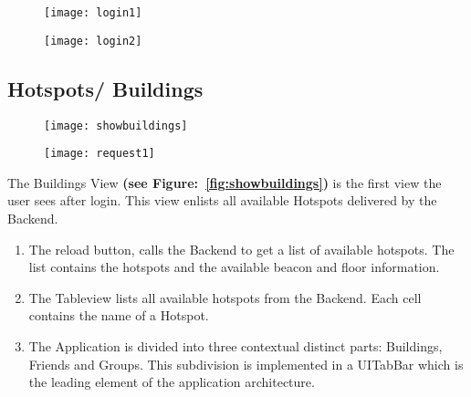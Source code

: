 \begin{figure}
\centering
\begin{minipage}{.5\textwidth}
  \centering
  \texttt{[image: login1]}
  \label{fig:login1}
\end{minipage}%
\begin{minipage}{.5\textwidth}
  \centering
  \texttt{[image: login2]}
  \label{fig:login2}
\end{minipage}
\end{figure}

\subsection{Hotspots/ Buildings}

\begin{figure}
\centering
\begin{minipage}{.5\textwidth}
  \centering
  \texttt{[image: showbuildings]}
  \label{fig:showbuildings}
\end{minipage}%
\begin{minipage}{.5\textwidth}
  \centering
  \texttt{[image: request1]}
  \label{fig:request1}
\end{minipage}
\end{figure}



The Buildings View \textbf{(see Figure:~\ref{fig:showbuildings})} is the first view the user sees after login. This view enlists all available Hotspots delivered by the Backend.

\begin{enumerate}
  \item The reload button, calls the Backend to get a list of available hotspots. The list contains the hotspots and the available beacon and floor information.
  \item The Tableview lists all available hotspots from the Backend. Each cell contains the name of a Hotspot.
  \item The Application is divided into three contextual distinct parts: Buildings, Friends and Groups. This subdivision is implemented in a UITabBar which is the leading element of the application architecture.
\end{enumerate}

